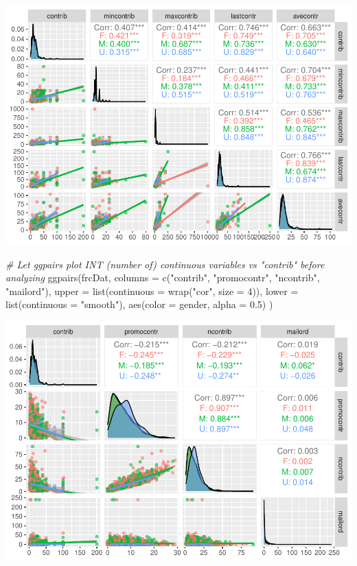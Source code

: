 \documentclass[
]{article}
\newenvironment{Shaded}{\begin{snugshade}}{\end{snugshade}}
\newcommand{\AttributeTok}[1]{\textcolor[rgb]{0.77,0.63,0.00}{#1}}
\newcommand{\CommentTok}[1]{\textcolor[rgb]{0.56,0.35,0.01}{\textit{#1}}}
\newcommand{\DecValTok}[1]{\textcolor[rgb]{0.00,0.00,0.81}{#1}}
\newcommand{\FloatTok}[1]{\textcolor[rgb]{0.00,0.00,0.81}{#1}}
\newcommand{\FunctionTok}[1]{\textcolor[rgb]{0.00,0.00,0.00}{#1}}
\newcommand{\NormalTok}[1]{#1}
\newcommand{\StringTok}[1]{\textcolor[rgb]{0.31,0.60,0.02}{#1}}
\begin{document}
\includegraphics{linear_regression__uc_files/figure-latex/unnamed-chunk-1-1.pdf}

\begin{Shaded}
\begin{Highlighting}[]
\CommentTok{\# Let ggpairs plot INT (number of) continuous variables vs "contrib" before analyzing}
\FunctionTok{ggpairs}\NormalTok{(frcDat, }\AttributeTok{columns =} \FunctionTok{c}\NormalTok{(}\StringTok{"contrib"}\NormalTok{, }\StringTok{"promocontr"}\NormalTok{, }\StringTok{"ncontrib"}\NormalTok{, }\StringTok{"mailord"}\NormalTok{), }
        \AttributeTok{upper =} \FunctionTok{list}\NormalTok{(}\AttributeTok{continuous =} \FunctionTok{wrap}\NormalTok{(}\StringTok{"cor"}\NormalTok{, }\AttributeTok{size =} \DecValTok{4}\NormalTok{)),}
        \AttributeTok{lower =} \FunctionTok{list}\NormalTok{(}\AttributeTok{continuous =} \StringTok{"smooth"}\NormalTok{),}
        \FunctionTok{aes}\NormalTok{(}\AttributeTok{color =}\NormalTok{ gender,  }
            \AttributeTok{alpha =} \FloatTok{0.5}\NormalTok{)}
\NormalTok{        )}
\end{Highlighting}
\end{Shaded}

\includegraphics{linear_regression__uc_files/figure-latex/unnamed-chunk-1-2.pdf}
\end{document}
